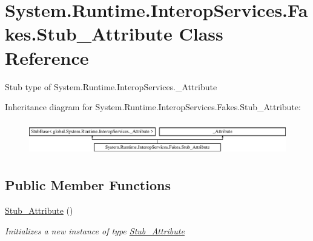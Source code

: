 \hypertarget{class_system_1_1_runtime_1_1_interop_services_1_1_fakes_1_1_stub___attribute}{\section{System.\-Runtime.\-Interop\-Services.\-Fakes.\-Stub\-\_\-\-Attribute Class Reference}
\label{class_system_1_1_runtime_1_1_interop_services_1_1_fakes_1_1_stub___attribute}
}


Stub type of System.\-Runtime.\-Interop\-Services.\-\_\-\-Attribute 


Inheritance diagram for System.\-Runtime.\-Interop\-Services.\-Fakes.\-Stub\-\_\-\-Attribute\-:\begin{figure}[H]
\begin{center}
\leavevmode
\includegraphics[height=1.497326cm]{class_system_1_1_runtime_1_1_interop_services_1_1_fakes_1_1_stub___attribute}
\end{center}
\end{figure}
\subsection*{Public Member Functions}
\begin{DoxyCompactItemize}
\item 
\hyperlink{class_system_1_1_runtime_1_1_interop_services_1_1_fakes_1_1_stub___attribute_ad0a045e1f888da1c123c44e438553d8b}{Stub\-\_\-\-Attribute} ()
\begin{DoxyCompactList}\small\item\em Initializes a new instance of type \hyperlink{class_system_1_1_runtime_1_1_interop_services_1_1_fakes_1_1_stub___attribute}{Stub\-\_\-\-Attribute}\end{DoxyCompactList}\end{DoxyCompactItemize}

